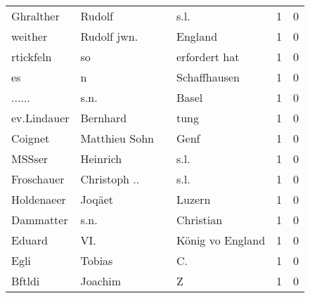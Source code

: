 \begin{tabular}{llllrr}
                Ghralther &                             Rudolf &             &                                        s.l. &          1 &         0 \\
                  weither &                        Rudolf jwn. &             &                                     England &          1 &         0 \\
                rtickfeln &                                 so &             &                               erfordert hat &          1 &         0 \\
                       es &                                  n &             &                                Schaffhausen &          1 &         0 \\
                   ...... &                               s.n. &             &                                       Basel &          1 &         0 \\
              ev.Lindauer &                           Bernhard &             &                                        tung &          1 &         0 \\
                  Coignet &                      Matthieu Sohn &             &                                        Genf &          1 &         0 \\
                   MSSser &                           Heinrich &             &                                        s.l. &          1 &         0 \\
               Froschauer &                       Christoph .. &             &                                        s.l. &          1 &         0 \\
               Holdenaeer &                             Joqäet &             &                                      Luzern &          1 &         0 \\
                Dammatter &                               s.n. &             &                                   Christian &          1 &         0 \\
                   Eduard &                                VI. &             &                            König vo England &          1 &         0 \\
                     Egli &                             Tobias &             &                                         C.  &          1 &         0 \\
                   Bftldi &                            Joachim &             &                                           Z &          1 &         0 \\

\end{tabular}
